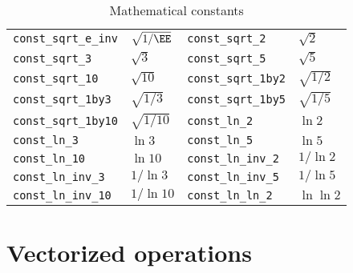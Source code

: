 \begin{table}
\begin{tabularx}{\textwidth}{LLLL}
    \verb|const_sqrt_e_inv|   & $\sqrt{1/\EE}$  &
    \verb|const_sqrt_2|       & $\sqrt{2}$      \\
    \verb|const_sqrt_3|       & $\sqrt{3}$      &
    \verb|const_sqrt_5|       & $\sqrt{5}$      \\
    \verb|const_sqrt_10|      & $\sqrt{10}$     &
    \verb|const_sqrt_1by2|    & $\sqrt{1/2}$    \\
    \verb|const_sqrt_1by3|    & $\sqrt{1/3}$    &
    \verb|const_sqrt_1by5|    & $\sqrt{1/5}$    \\
    \verb|const_sqrt_1by10|   & $\sqrt{1/10}$   &
    \verb|const_ln_2|         & $\ln{2}$        \\
    \verb|const_ln_3|         & $\ln{3}$        &
    \verb|const_ln_5|         & $\ln{5}$        \\
    \verb|const_ln_10|        & $\ln{10}$       &
    \verb|const_ln_inv_2|     & $1/\ln{2}$      \\
    \verb|const_ln_inv_3|     & $1/\ln{3}$      &
    \verb|const_ln_inv_5|     & $1/\ln{5}$      \\
    \verb|const_ln_inv_10|    & $1/\ln{10}$     &
    \verb|const_ln_ln_2|      & $\ln\ln{2}$     \\
    \bottomrule
  \end{tabularx}
  \caption{Mathematical constants}
  \label{tab:Mathematical constants}
\end{table}

\section{Vectorized operations}
\label{sec:Vectorized operations}

